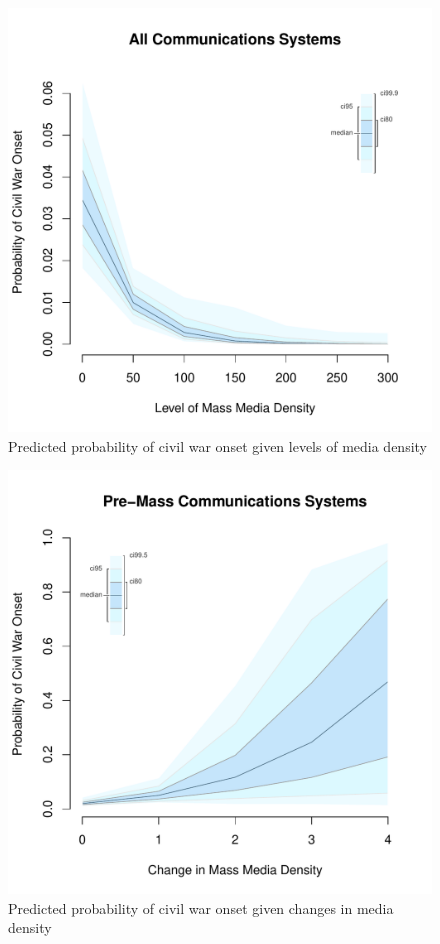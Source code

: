 \documentclass[11pt,article,oneside]{memoir}
\makeatletter
\def\maxwidth{\ifdim\Gin@nat@width>\linewidth\linewidth
\else\Gin@nat@width\fi}
\let\Oldincludegraphics\includegraphics
\renewcommand{\includegraphics}[1]{\Oldincludegraphics[width=\maxwidth]{#1}}
\makeatother
\begin{document}
\clearpage

\begin{figure} 
\includegraphics{figure/mdi_effect.pdf} 
\caption{Predicted probability of civil war onset given levels of media density} 
\label{myFigur} 
\end{figure}

\clearpage

\begin{figure} 
\includegraphics{figure/d_mdi_effect.pdf} 
\caption{Predicted probability of civil war onset given changes in media density} 
\label{myFigz} 
\end{figure}
\end{document}
